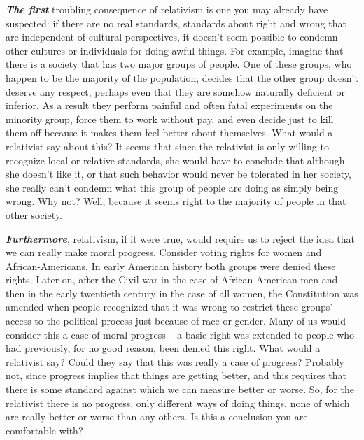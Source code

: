 \documentclass[12pt, openany]{book}
\begin{document}
\textbf{\emph{The first}} troubling consequence of relativism is one you may already have suspected: if there are no real standards, standards about right and wrong that are independent of cultural perspectives, it doesn't seem possible to condemn other cultures or individuals for doing awful things. For example, imagine that there is a society that has two major groups of people. One of these groups, who happen to be the majority of the population, decides that the other group doesn't deserve any respect, perhaps even that they are somehow naturally deficient or inferior. As a result they perform painful and often fatal experiments on the minority group, force them to work without pay, and even decide just to kill them off because it makes them feel better about themselves. What would a relativist say about this? It seems that since the relativist is only willing to recognize local or relative standards, she would have to conclude that although she doesn't like it, or that such behavior would never be tolerated in her society, she really can't condemn what this group of people are doing as simply being wrong. Why not? Well, because it seems right to the majority of people in that other society.

\textbf{\emph{Furthermore}}, relativism, if it were true, would require us to reject the idea that we can really make moral progress. Consider voting rights for women and African-Americans. In early American history both groups were denied these rights. Later on, after the Civil war in the case of African-American men and then in the early twentieth century in the case of all women, the Constitution was amended when people recognized that it was wrong to restrict these groups' access to the political process just because of race or gender. Many of us would consider this a case of moral progress -- a basic right was extended to people who had previously, for no good reason, been denied this right. What would a relativist say? Could they say that this was really a case of progress? Probably not, since progress implies that things are getting better, and this requires that there is some standard against which we can measure better or worse. So, for the relativist there is no progress, only different ways of doing things, none of which are really better or worse than any others. Is this a conclusion you are comfortable with?
\end{document}
